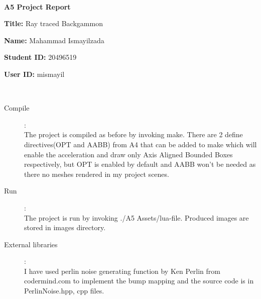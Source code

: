 \documentclass {article}
\begin{document}
~\vfill
\begin{center}
\Large

{\bf A5 Project Report}

{\bf Title:} Ray traced Backgammon

{\bf Name:} Mahammad Ismayilzada

{\bf Student ID:} 20496519

{\bf User ID:} mismayil
\end{center}
\vfill ~\vfill~
\newpage
\begin{description}
\item[Compile]:\\
The project is compiled as before by invoking make. There are 2 define directives(OPT and AABB) from A4 that can be added to make
which will enable the acceleration and draw only Axis Aligned Bounded Boxes respectively, but OPT is enabled by default and AABB
won't be needed as there no meshes rendered in my project scenes.

\item[Run]:\\
The project is run by invoking ./A5 Assets/lua-file. Produced images are stored in images directory.

\item[External libraries]:\\
I have used perlin noise generating function by Ken Perlin from codermind.com to implement the bump mapping and the source code is in PerlinNoise.{hpp, cpp} files.


\end{description}
\end{document}
